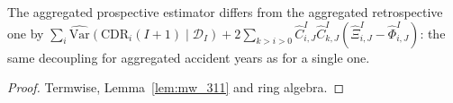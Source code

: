 \begin{theorem}[Display (3.16)]\label{thm:mw_total}\leanok
{}
The aggregated prospective estimator differs from the aggregated retrospective one by
$\sum_i \widehat{\mathrm{Var}}(\mathrm{CDR}_i(I+1)\mid\mathcal{D}_I)
 + 2\sum_{k>i>0}\hat C^I_{i,J}\hat C^I_{k,J}(\hat\Xi^I_{i,J} - \hat\Phi^I_{i,J})$: the same
decoupling for aggregated accident years as for a single one.
\end{theorem}
\begin{proof}\leanok Termwise, Lemma~\ref{lem:mw_311} and ring algebra. \end{proof}
